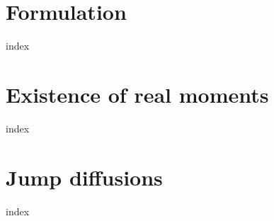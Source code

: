 \label{affine-processes:introduction}


\section{Formulation}
\label{affine-processes:formulation}
{index}

\section{Existence of real moments}
\label{affine-processes:existence}
{index}

\section{Jump diffusions}
\label{affine-processes:jump-diffusions}
{index}
